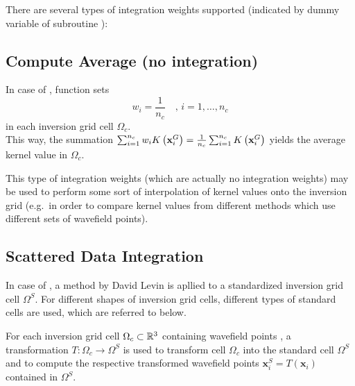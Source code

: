 There are several types of integration weights supported (indicated by dummy variable  of 
subroutine ):
%
\setcounter{subsection}{-1}
\subsection{Compute Average (no integration)} \label{programs_scripts,sec:fmod_intw,sub:average}
%
In case of , function  sets 
\[w_i = \frac{1}{n_c} \quad ,\, i=1,\dots,n_c\]
in each inversion grid cell $\Omega_c$.\\
This way, the summation $\sum_{i=1}^{n_c} w_iK\left( \mathbf{x}_i^G \right) = \frac{1}{n_c} \sum_{i=1}^{n_c} 
K\left( \mathbf{x}_i^G \right)$ yields the average kernel value in $\Omega_c$.

This type of integration weights (which are actually no integration weights) may be used to perform some 
sort of interpolation of kernel values onto the inversion grid (e.g.~in order to compare kernel values 
from different methods which use different sets of wavefield points).
%
\subsection{Scattered Data Integration} \label{programs_scripts,sec:fmod_intw,sub:SDI}
%
In case of , a method by David Levin \cite{Levin99} is apllied to a
standardized inversion grid cell $\Omega^S$. For different shapes of inversion grid cells, different 
types of standard cells are used, which are referred to below.

For each inversion grid cell $\Omega_c \subset \mathbb{R}^3$ containing wavefield points \wpG, a transformation 
$T : \Omega_c \rightarrow \Omega^S$ is used to transform cell $\Omega_c$ into the standard cell $\Omega^S$ 
and to compute the respective transformed wavefield points $\mathbf{x}_i^S = T\left(\mathbf{x}_i\right)$ 
contained in $\Omega^S$.

